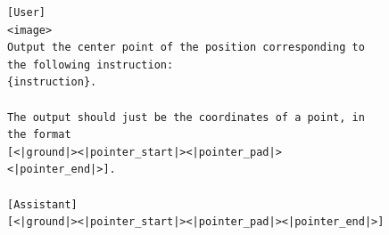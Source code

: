 \begin{figure}[t]
\begin{tcolorbox}[colback=white, width=\linewidth, breakable, enhanced, 
                  title=Prompt for the UI-Venus-1.5 Retrofit Model, fonttitle=\bfseries, label=prompt:uivenus-retrofit]

\lstset{
basicstyle=\scriptsize\ttfamily,
    columns=fullflexible,
    breaklines=true,
    breakatwhitespace=false,
    showstringspaces=false,
    lineskip=-1pt
}

\begin{lstlisting}
[User]
<image>
Output the center point of the position corresponding to the following instruction:
{instruction}.

The output should just be the coordinates of a point, in the format
[<|ground|><|pointer_start|><|pointer_pad|><|pointer_end|>].

[Assistant]
[<|ground|><|pointer_start|><|pointer_pad|><|pointer_end|>]
\end{lstlisting}

\end{tcolorbox}
\end{figure}
